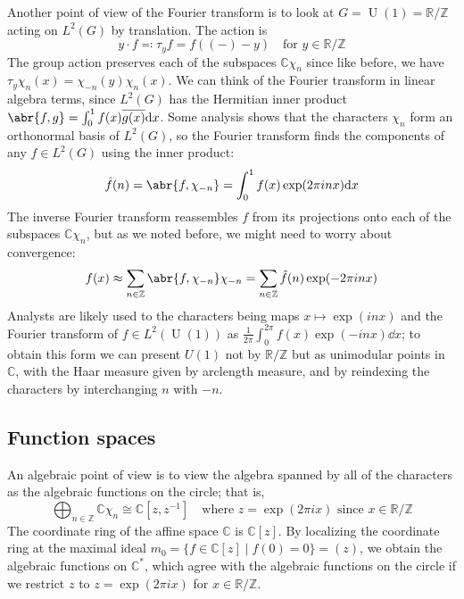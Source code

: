 \documentclass[11pt,leqno]{article}
\theoremstyle{plain}
\theoremstyle{definition}
\numberwithin{equation}{section}
\numberwithin{lem}{section}
\DeclareMathOperator{\U}{U}
\begin{document}
Another point of view of the Fourier transform is to look at $G = \U(1)= \mathbb R/\mathbb Z$ acting on $L^2(G)$ by translation. The action is 
\[y\cdot f \eqqcolon \tau_yf = f((-)-y)\quad \text{for }y\in\mathbb R/\mathbb Z\]
The group action preserves each of the subspaces $\mathbb C\chi_n$ since like before, we have $\tau_y\chi_n(x) = \chi_{-n}(y)\chi_n(x)$. We can think of the Fourier transform in linear algebra terms, since $L^2(G)$ has the Hermitian inner product $\abr{f,g} = \int_0^1f(x)\overline{g(x)}\dd x$. Some analysis shows that the characters $\chi_n$ form an orthonormal basis of $L^2(G)$, so the Fourier transform finds the components of any $f\in L^2(G)$ using the inner product:
\[\hat f(n) = \abr{f,\chi_{-n}} = \int_0^1 f(x)\exp(2\pi inx)\dd x\]
The inverse Fourier transform reassembles $f$ from its projections onto each of the subspaces $\mathbb C\chi_n$, but as we noted before, we might need to worry about convergence:
\[f(x) \approx \sum_{n\in\mathbb Z}\abr{f,\chi_{-n}}\chi_{-n} = \sum_{n\in\mathbb Z}\hat f(n)\exp(-2\pi i nx)\]
Analysts are likely used to the characters being maps $x\mapsto \exp(inx)$ and the Fourier transform of $f\in L^2(\U(1))$ as $\frac{1}{2\pi}\int_0^{2\pi}f(x)\exp(-inx)\dd x$; to obtain this form we can present $U(1)$ not by $\mathbb R/\mathbb Z$ but as unimodular points in $\mathbb C$, with the Haar measure given by arclength measure, and by reindexing the characters by interchanging $n$ with $-n$.

\subsection{Function spaces}
An algebraic point of view is to view the algebra spanned by all of the characters as the algebraic functions on the circle; that is,
\[\bigoplus_{n\in\mathbb Z}\mathbb C\chi_n\cong\mathbb C[z,z^{-1}]\quad\text{where $z = \exp(2\pi ix)$ since $x\in \mathbb R/\mathbb Z$}\]
The coordinate ring of the affine space $\mathbb C$ is $\mathbb C[z]$. By localizing the coordinate ring at the maximal ideal $m_0 = \{f\in \mathbb C[z]\mid f(0) = 0\} = (z)$, we obtain the algebraic functions on $\mathbb C^\ast$, which agree with the algebraic functions on the circle if we restrict $z$ to $z = \exp(2\pi i x)$ for $x\in\mathbb R/\mathbb Z$.
\end{document}

